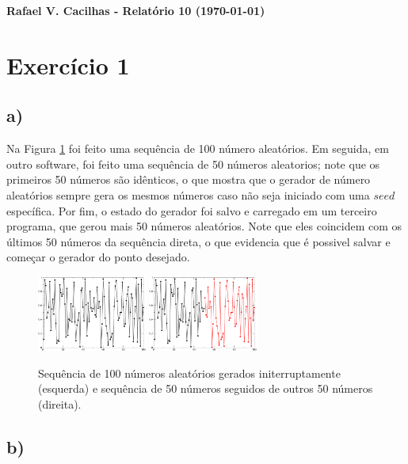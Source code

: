 \documentclass[a4wide]{report}
\begin{document}
\noindent
{\bf Rafael V. Cacilhas  - Relatório 10 (\today)}

\vspace{0.5cm}

\section*{Exercício 1}

\subsection*{a) }
Na Figura \ref{1a} foi feito uma sequência de 100 número aleatórios. Em seguida, em outro software, foi feito uma sequência de 50 números aleatorios; note que os primeiros 50 números são idênticos, o que mostra que o gerador de número aleatórios sempre gera os mesmos números caso não seja iniciado com uma $\textit{seed}$ específica. Por fim, o estado do gerador foi salvo e carregado em um terceiro programa, que gerou mais 50 números aleatórios. Note que eles coincidem com os últimos 50 números da sequência direta, o que evidencia que é possivel salvar e começar o gerador do ponto desejado.

\begin{figure}[!htb]
\centering
\includegraphics[width=0.32\textwidth]{sequencia_direta.pdf}
\includegraphics[width=0.32\textwidth]{sequencia_meio2.pdf}
\caption{Sequência de 100 números aleatórios gerados initerruptamente (esquerda) e sequência de 50 números seguidos de outros 50 números (direita).}
\label{1a}
\end{figure}




\subsection*{b) }
\end{document}
